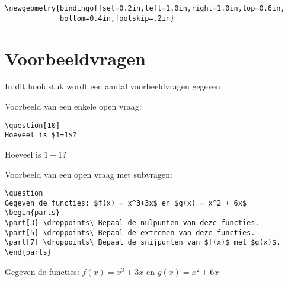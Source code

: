 \documentclass[12pt,dutch,addpoints,fleqn]{tisdexam}
\begin{document}
\begin{lstlisting}
\newgeometry{bindingoffset=0.2in,left=1.0in,right=1.0in,top=0.6in,
             bottom=0.4in,footskip=.2in}
\end{lstlisting}

\section{Voorbeeldvragen}
In dit hoofdstuk wordt een aantal voorbeeldvragen gegeven


\begin{questions}
Voorbeeld van een enkele open vraag:
         
\begin{lstlisting}
\question[10]
Hoeveel is $1+1$?
\end{lstlisting}
\question[10]
Hoeveel is $1+1$?


\bigskip\noindent
Voorbeeld van een open vraag met subvragen:

\begin{lstlisting}
\question
Gegeven de functies: $f(x) = x^3+3x$ en $g(x) = x^2 + 6x$
\begin{parts}
\part[3] \droppoints\ Bepaal de nulpunten van deze functies.
\part[5] \droppoints\ Bepaal de extremen van deze functies.
\part[7] \droppoints\ Bepaal de snijpunten van $f(x)$ met $g(x)$.
\end{parts}
\end{lstlisting}
\question
Gegeven de functies: $f(x) = x^3+3x$ en $g(x) = x^2 +6x$


\end{questions}
\end{document}

